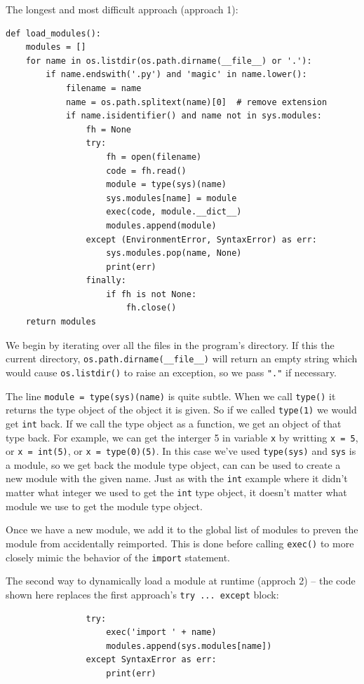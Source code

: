 The longest and most difficult approach (approach 1):
\begin{lstlisting}
def load_modules():
    modules = []
    for name in os.listdir(os.path.dirname(__file__) or '.'):
        if name.endswith('.py') and 'magic' in name.lower():
            filename = name
            name = os.path.splitext(name)[0]  # remove extension
            if name.isidentifier() and name not in sys.modules:
                fh = None
                try:
                    fh = open(filename)
                    code = fh.read()
                    module = type(sys)(name)
                    sys.modules[name] = module
                    exec(code, module.__dict__)
                    modules.append(module)
                except (EnvironmentError, SyntaxError) as err:
                    sys.modules.pop(name, None)
                    print(err)
                finally:
                    if fh is not None:
                        fh.close()
    return modules  
\end{lstlisting}
      
We begin by iterating over all the files in the program's directory.
If this the current directory, \verb|os.path.dirname(__file__)| will return an empty string
which would cause \verb|os.listdir()| to raise an exception,
so we pass \verb|"."| if necessary.


The line \verb|module = type(sys)(name)| is quite subtle.
When we call \verb|type()| it returns the type object of the object it is given.
So if we called \verb|type(1)| we would get \verb|int| back.
If we call the type object as a function, we get an object of that type back.
For example, we can get the interger 5 in variable \verb|x| by writting \verb|x = 5|, or \verb|x = int(5)|,
or \verb|x = type(0)(5)|.
In this case we've used \verb|type(sys)| and \verb|sys| is a module,
so we get back the module type object, can
can be used to create a new module with the given name.
Just as with the \verb|int| example where it didn't matter what integer we used to get the \verb|int| type object,
it doesn't matter what module we use to get the module type object.


Once we have a new module, we add it to the global list of modules to preven the module from accidentally reimported.
This is done before calling \verb|exec()| to more closely mimic the behavior of the \verb|import| statement.


The second way to dynamically load a module at runtime (approch 2) --
the code shown here replaces the first approach’s \verb|try ... except| block:
\begin{lstlisting}
                try:
                    exec('import ' + name)
                    modules.append(sys.modules[name])
                except SyntaxError as err:
                    print(err)  
\end{lstlisting}

